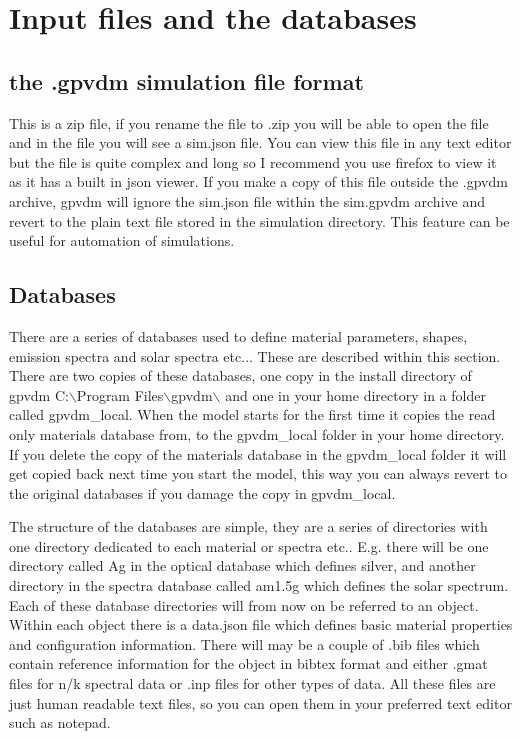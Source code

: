 \newpage
\section{Input files and the databases}

\subsection{the .gpvdm simulation file format}
\label{sec:gpvdmfileformat}
This is a zip file, if you rename the file to .zip you will be able to open the file and in the file you will see a sim.json file.  You can view this file in any text editor but the file is quite complex and long so I recommend you use firefox to view it as it has a built in json viewer.  If you make a copy of this file outside the .gpvdm archive, gpvdm will ignore the sim.json file within the sim.gpvdm archive and revert to the plain text file stored in the simulation directory.  This feature can be useful for automation of simulations.

\subsection{Databases}
There are a series of databases used to define material parameters, shapes, emission spectra and solar spectra etc...  These are described within this section.  There are two copies of these databases, one copy in the install directory of gpvdm  C:$\backslash$Program Files$\backslash$gpvdm$\backslash$ and one in your home directory in a folder called gpvdm\_local.   When the model starts for the first time it copies the read only materials database from, to the gpvdm\_local folder in your home directory.  If you delete the copy of the materials database in the gpvdm\_local folder it will get copied back next time you start the model, this way you can always revert to the original databases if you damage the copy in gpvdm\_local.

The structure of the databases are simple, they are a series of directories with one directory dedicated to each material or spectra etc.. E.g. there will be one directory called Ag in the optical database which defines silver, and another directory in the spectra database called am1.5g which defines the solar spectrum.  Each of these database directories will from now on be referred to an object.  Within each object there is a data.json file which defines basic material properties and configuration information.  There will may be a couple of .bib files which contain reference information for the object in bibtex format and either .gmat files for n/k spectral data or .inp files for other types of data.  All these files are just human readable text files, so you can open them in your preferred text editor such as notepad.

